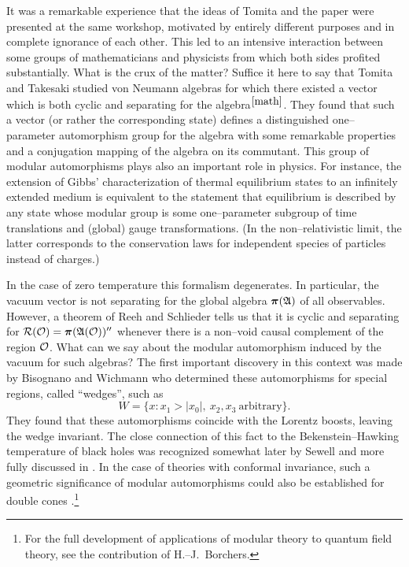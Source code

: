 It was a remarkable experience that the ideas of
Tomita and the paper \cite{HaHuWi} were presented at the same
workshop, motivated by entirely different purposes and in complete
ignorance of each other. This led to an intensive interaction between
some groups of mathematicians and physicists from which both sides
profited substantially. What is the crux of the matter? Suffice it
here to say that Tomita and Takesaki studied von Neumann algebras for
which there existed a vector which is both cyclic and separating 
for the algebra$^{\ref{math}}$.
They found that such a vector (or rather the corresponding
state) defines a distinguished one--parameter automorphism group for the
algebra with some remarkable properties and a conjugation 
mapping of the algebra on its commutant. This group of modular
automorphisms plays also an important 
role in physics. For instance, the extension of
Gibbs' characterization of thermal equilibrium states to an infinitely
extended medium is equivalent to the statement that equilibrium 
is described by any state whose modular group is some one--parameter 
subgroup of time translations and (global) gauge transformations.
(In the non--relativistic limit, the latter corresponds to the  
conservation laws for independent species of particles instead of 
charges.)  

In the case of zero temperature this
formalism degenerates. In particular, the vacuum vector is not
separating for the global algebra $\mbox{{\boldmath $\pi$}} ({\mathfrak A})$ of all observables. 
However, a theorem of Reeh and
Schlieder \cite{ReSch} tells us that it is cyclic and
separating for $\cal{R(O)} = \mbox{{\boldmath $\pi$}} ({\mathfrak A} ({\cal O}))^{\prime \prime}$ 
whenever there is a non--void causal
complement of the region $\cal O$. What can we say about the modular
automorphism induced by the vacuum for such algebras? The first
important discovery in this context was made by Bisognano and Wichmann
\cite{BiWi} who determined these 
automorphisms for special regions, called ``wedges'', 
such as 
\begin{equation} \label{wedge}
W = \{ x : x_1 > |x_0|, \ x_2, x_3 \ \mbox{arbitrary} \}.
\end{equation}
They found that these automorphisms coincide with the 
Lorentz boosts, leaving the wedge invariant. 
The close connection of this fact to the Bekenstein--Hawking
temperature of black holes was recognized somewhat later 
by Sewell \cite{Sew} and more fully discussed 
in \cite{HaNaSt}. In the case of theories
with conformal invariance, such a geometric significance of modular
automorphisms could also be established for double 
cones \cite{HiLo}.\footnote{For the full development of applications of modular
theory to quantum field theory, see the contribution of 
H.--J.\ Borchers.}

